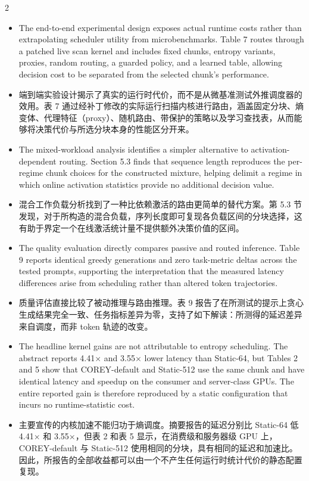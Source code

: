 \documentclass[10pt,a4paper]{article}
\newcommand{\Pair}[2]{#1\par\switchcolumn #2\par\switchcolumn*}
\newcommand{\fieldhead}[1]{{\color{accent}\sffamily\bfseries #1}}
\newcommand{\PairHead}[2]{\Pair{\needspace{5\baselineskip}\fieldhead{#1}}%
                               {\needspace{5\baselineskip}\fieldhead{#2}}}
\newcommand{\PItem}[3]{\Pair{\begin{itemize}[label={#1}]\item #2\end{itemize}}%
                            {\begin{itemize}[label={#1}]\item #3\end{itemize}}}
\begin{document}
\begin{paracol}{2}
\PairHead{Strengths}{优点}

\PItem{\textbullet}{The end-to-end experimental design exposes actual runtime costs
rather than extrapolating scheduler utility from microbenchmarks. Table 7 routes
through a patched live scan kernel and includes fixed chunks, entropy variants,
proxies, random routing, a guarded policy, and a learned table, allowing decision
cost to be separated from the selected chunk's performance.}
{端到端实验设计揭示了真实的运行时代价，而不是从微基准测试外推调度器的效用。表 7 通过经补丁修改的实际运行扫描内核进行路由，涵盖固定分块、熵变体、代理特征（proxy）、随机路由、带保护的策略以及学习查找表，从而能够将决策代价与所选分块本身的性能区分开来。}

\PItem{\textbullet}{The mixed-workload analysis identifies a simpler alternative to
activation-dependent routing. Section 5.3 finds that sequence length reproduces the
per-regime chunk choices for the constructed mixture, helping delimit a regime in
which online activation statistics provide no additional decision value.}
{混合工作负载分析找到了一种比依赖激活的路由更简单的替代方案。第 5.3 节发现，对于所构造的混合负载，序列长度即可复现各负载区间的分块选择，这有助于界定一个在线激活统计量不提供额外决策价值的区间。}

\PItem{\textbullet}{The quality evaluation directly compares passive and routed
inference. Table 9 reports identical greedy generations and zero task-metric deltas
across the tested prompts, supporting the interpretation that the measured latency
differences arise from scheduling rather than altered token trajectories.}
{质量评估直接比较了被动推理与路由推理。表 9 报告了在所测试的提示上贪心生成结果完全一致、任务指标差异为零，支持了如下解读：所测得的延迟差异来自调度，而非 token 轨迹的改变。}

\PairHead{Weaknesses}{不足}

\PItem{\textbullet}{The headline kernel gains are not attributable to entropy
scheduling. The abstract reports 4.41$\times$ and 3.55$\times$ lower latency than
Static-64, but Tables 2 and 5 show that COREY-default and Static-512 use the same
chunk and have identical latency and speedup on the consumer and server-class GPUs.
The entire reported gain is therefore reproduced by a static configuration that
incurs no runtime-statistic cost.}
{主要宣传的内核加速不能归功于熵调度。摘要报告的延迟分别比 Static-64 低 4.41$\times$ 和 3.55$\times$，但表 2 和表 5 显示，在消费级和服务器级 GPU 上，COREY-default 与 Static-512 使用相同的分块，具有相同的延迟和加速比。因此，所报告的全部收益都可以由一个不产生任何运行时统计代价的静态配置复现。}


\end{paracol}
\end{document}
